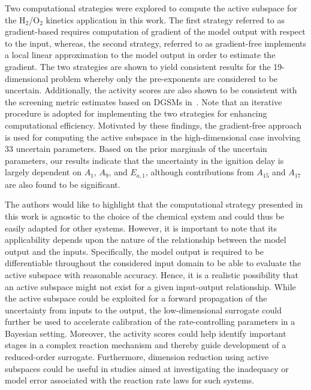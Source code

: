 Two computational strategies were explored to compute the active subspace for the H$_2$/O$_2$
kinetics application in this work. The first strategy referred to as gradient-based requires computation of gradient of the 
model output with respect to the input, whereas, the second strategy, referred to as gradient-free implements a local
linear approximation to the model output in order to estimate the gradient. The two strategies are shown to yield
consistent results for the 19-dimensional problem whereby only the pre-exponents are considered to be uncertain.
Additionally, the activity scores are also shown to be consistent with the screening metric estimates based on
DGSMs in~\cite{Vohra:2018}. Note that an iterative procedure is adopted for implementing the two strategies
for enhancing computational efficiency. 
Motivated by these findings, the gradient-free approach is used for computing the active subspace in the high-dimensional
case involving 33 uncertain parameters. Based on the prior marginals of the uncertain parameters, our results
indicate that the uncertainty in the ignition delay is largely dependent on $A_1$, $A_9$, and $E_{a,1}$, although
 contributions from $A_{15}$ and $A_{17}$ are also found to be significant. 
 
 The authors would like to highlight that the computational strategy presented in this work is agnostic to the choice
 of the chemical system and could thus be easily adapted for other systems. However, it is important to note that
 its applicability depends upon the nature of the relationship between the model output and the inputs. Specifically,
 the model output is required to be differentiable throughout the considered input domain to be able to evaluate
 the active subspace with reasonable accuracy. Hence, it is a realistic possibility that an active subspace might not
 exist for a given input-output relationship. While the active subspace could be exploited for a forward propagation of
 the uncertainty from inputs to the output, the low-dimensional surrogate could further be used to accelerate 
 calibration of the rate-controlling parameters in a Bayesian setting. Moreover, the activity scores could help
 identify important stages in a complex reaction mechanism and thereby guide development of a reduced-order
 surrogate. Furthermore, dimension reduction using active subspaces could be useful in studies aimed at
 investigating the inadequacy or model error associated with the reaction rate laws for such systems.  
 
 
 
 
 
 
 
